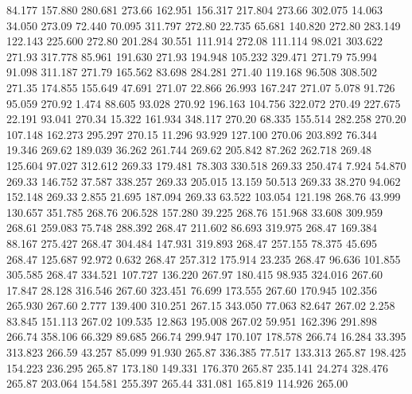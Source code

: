   84.177  157.880  280.681       273.66
 162.951  156.317  217.804       273.66
 302.075   14.063   34.050       273.09
  72.440   70.095  311.797       272.80
  22.735   65.681  140.820       272.80
 283.149  122.143  225.600       272.80
 201.284   30.551  111.914       272.08
 111.114   98.021  303.622       271.93
 317.778   85.961  191.630       271.93
 194.948  105.232  329.471       271.79
  75.994   91.098  311.187       271.79
 165.562   83.698  284.281       271.40
 119.168   96.508  308.502       271.35
 174.855  155.649   47.691       271.07
  22.866   26.993  167.247       271.07
   5.078   91.726   95.059       270.92
   1.474   88.605   93.028       270.92
 196.163  104.756  322.072       270.49
 227.675   22.191   93.041       270.34
  15.322  161.934  348.117       270.20
  68.335  155.514  282.258       270.20
 107.148  162.273  295.297       270.15
  11.296   93.929  127.100       270.06
 203.892   76.344   19.346       269.62
 189.039   36.262  261.744       269.62
 205.842   87.262  262.718       269.48
 125.604   97.027  312.612       269.33
 179.481   78.303  330.518       269.33
 250.474    7.924   54.870       269.33
 146.752   37.587  338.257       269.33
 205.015   13.159   50.513       269.33
  38.270   94.062  152.148       269.33
   2.855   21.695  187.094       269.33
  63.522  103.054  121.198       268.76
  43.999  130.657  351.785       268.76
 206.528  157.280   39.225       268.76
 151.968   33.608  309.959       268.61
 259.083   75.748  288.392       268.47
 211.602   86.693  319.975       268.47
 169.384   88.167  275.427       268.47
 304.484  147.931  319.893       268.47
 257.155   78.375   45.695       268.47
 125.687   92.972    0.632       268.47
 257.312  175.914   23.235       268.47
  96.636  101.855  305.585       268.47
 334.521  107.727  136.220       267.97
 180.415   98.935  324.016       267.60
  17.847   28.128  316.546       267.60
 323.451   76.699  173.555       267.60
 170.945  102.356  265.930       267.60
   2.777  139.400  310.251       267.15
 343.050   77.063   82.647       267.02
   2.258   83.845  151.113       267.02
 109.535   12.863  195.008       267.02
  59.951  162.396  291.898       266.74
 358.106   66.329   89.685       266.74
 299.947  170.107  178.578       266.74
  16.284   33.395  313.823       266.59
  43.257   85.099   91.930       265.87
 336.385   77.517  133.313       265.87
 198.425  154.223  236.295       265.87
 173.180  149.331  176.370       265.87
 235.141   24.274  328.476       265.87
 203.064  154.581  255.397       265.44
 331.081  165.819  114.926       265.00
